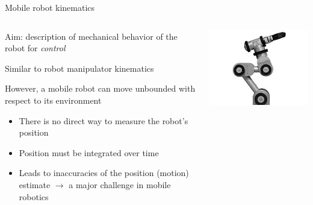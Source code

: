 \documentclass[compress]{beamer}
\begin{document}
\begin{frame}{Mobile robot kinematics}

    \begin{columns}
        \begin{column}{0.6\linewidth}
            Aim: description of mechanical behavior of the robot for \emph{control}

            Similar to robot manipulator kinematics

            However, a mobile robot can move unbounded with respect to its
            environment

            \begin{itemize}
                \item There is no direct way to measure the robot's position
                \item Position must be integrated over time
                \item Leads to inaccuracies of the position (motion) estimate
                    $\rightarrow$ a major challenge in mobile robotics
            \end{itemize}

        \end{column}
        \begin{column}{0.4\linewidth}
            \begin{center}
                \includegraphics[width=\linewidth]{kinematics_ex1}
            \end{center}
        \end{column}
    \end{columns}

\end{frame}
\end{document}
